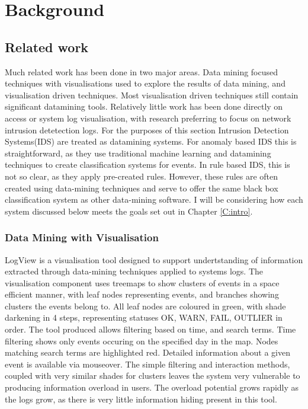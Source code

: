 \chapter{Background}\label{C:back}

\section{Related work}
Much related work has been done in two major areas. Data mining focused techniques with visualisations used to explore the results of data mining, and visualisation driven techniques. Most visualisation driven techniques still contain significant datamining tools. Relatively little work has been done directly on access or system log visualisation, with research preferring to focus on network intrusion detetection logs. For the purposes of this section Intrusion Detection Systems(IDS) are treated as datamining systems. For anomaly based IDS this is straightforward, as they use traditional machine learning and datamining techniques to create classification systems for events. In rule based IDS, this is not so clear, as they apply pre-created rules. However, these rules are often created using data-mining techniques and serve to offer the same black box classification system as other data-mining software. I will be considering how each system discussed below meets the goals set out in Chapter \ref{C:intro}.

\subsection{Data Mining with Visualisation}

LogView \cite{4641277} is a visualisation tool designed to support undertstanding of information extracted through data-mining techniques applied to systems logs. The visualisation component uses treemaps to show clusters of events in a space efficient manner, with leaf nodes representing events, and branches showing clusters the events belong to. All leaf nodes are coloured in green, with shade darkening in 4 steps, representing  statuses OK, WARN, FAIL, OUTLIER in order.  The tool produced allows filtering based on time, and search terms. Time filtering shows only events occuring on the specified day in the map. Nodes matching search terms are highlighted red. Detailed information about a given event is available via mouseover. The simple filtering and interaction methods, coupled with very similar shades for clusters leaves the system very vulnerable to producing information overload in users. The overload potential grows rapidly as the logs grow, as there is very little information hiding present in this tool. 

